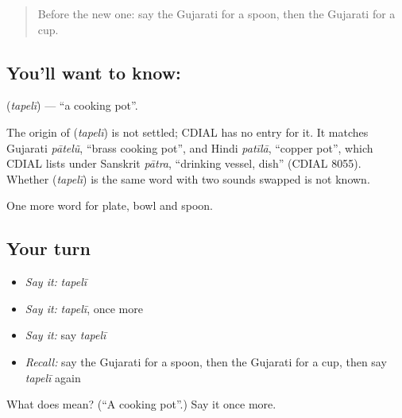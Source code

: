 \label{lesson:GU-C61-pot}



\begin{quote}
Before the new one: say the Gujarati for a spoon, then the Gujarati for a cup.
\end{quote}

\subsection*{You'll want to know: }
\textbf{} (\emph{tapelī}) — \textquotedblleft{}a cooking pot\textquotedblright{}.

\begin{cousinweb}
The origin of \textbf{} (\emph{tapelī}) is not settled; CDIAL has no entry for it. It matches Gujarati \emph{pātelũ}, \textquotedblleft{}brass cooking pot\textquotedblright{}, and Hindi \emph{patīlā}, \textquotedblleft{}copper pot\textquotedblright{}, which CDIAL lists under Sanskrit \emph{pātra}, \textquotedblleft{}drinking vessel, dish\textquotedblright{} (CDIAL 8055). Whether \textbf{} (\emph{tapelī}) is the same word with two sounds swapped is not known.
\end{cousinweb}

\begin{grammarlens}[title={What you've built}]
One more word for plate, bowl and spoon.
\end{grammarlens}

\subsection*{Your turn}
\begin{itemize}
\raggedright
  \item \emph{Say it:} \emph{tapelī}
  \item \emph{Say it:} \emph{tapelī}, once more
  \item \emph{Say it:} say \emph{tapelī}
  \item \emph{Recall:} say the Gujarati for a spoon, then the Gujarati for a cup, then say \emph{tapelī} again
\end{itemize}

\begin{tcolorbox}[breakable,colback=teal!4,colframe=teal!35!black,title={Before you move on}]
What does  mean? (\textquotedblleft{}A cooking pot\textquotedblright{}.) Say it once more.
\end{tcolorbox}
